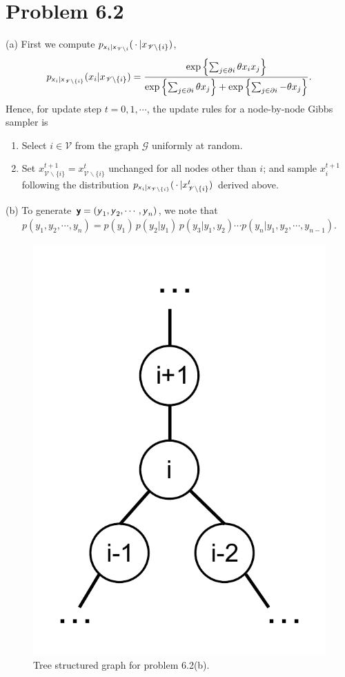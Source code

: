 \documentclass{article}
\newcommand{\s}[1]{\textsf{\textit{#1}}}
\newcommand{\bs}[1]{\textsf{\textbf{#1}}}
\begin{document}
\section*{Problem 6.2}
(a) First we compute
$p_{\s{x}_i | \s{x}_{\mathscr{V}\backslash i}}(\,\cdot \,| x_{\mathscr{V}\backslash \{i\}})$,
%
\begin{align*}
	p_{\s{x}_i | \s{x}_{\mathscr{V}\backslash\{i\}}}(x_i| x_{\mathscr{V}\backslash \{i\}}) =
	\frac{\exp\left\{\sum_{j \in \partial i}\theta x_i x_j\right\}}
	{\exp\left\{\sum_{j \in \partial i}\theta x_j\right\} +
	\exp\left\{\sum_{j \in \partial i} -\theta x_j\right\}}.
\end{align*}
Hence, for update step $t = 0, 1, \cdots$, the update rules for a node-by-node Gibbs sampler is
\begin{enumerate}
	\item Select $i \in \mathscr{V}$ from the graph $\mathscr{G}$ uniformly at random.
	\item Set $x^{t+1}_{\mathscr{V}\backslash\{i\}} = x^t_{\mathscr{V}\backslash\{i\}}$
	unchanged for all nodes other than $i$; and sample $x^{t+1}_i$ following the
	distribution $p_{\s{x}_i | \s{x}_{\mathscr{V}\backslash \{i\}}}
	(\,\cdot \,| x^t_{\mathscr{V}\backslash \{i\}})$ derived above.\\
\end{enumerate}

\noindent
(b) To generate $\bs{y} = (\s{y}_1, \s{y}_2, \cdots, \s{y}_n)$, we note that
\begin{align*}
	p(y_1, y_2, \cdots, y_n) = p(y_1)\, p (y_2 | y_1)\, p(y_3 | y_1, y_2) \cdots p(y_n | y_1, y_2, \cdots, y_{n-1}).
\end{align*}
%
\begin{figure}[h!]
  \centering
  \vspace{-0.3cm}
  \includegraphics[width=0.2\columnwidth]{62b.pdf}
    \vspace{-0.1cm}
  \caption{Tree structured graph for problem 6.2(b).}
  \label{f:62b}
\end{figure}
%
\end{document}
